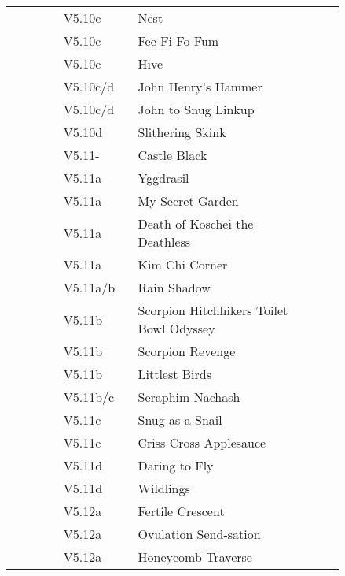 \begin{flushleft}
\begin{center}
\begin{supertabular}{p{0.13\linewidth}p{0.18\linewidth}p{0.45\linewidth}p{0.08\linewidth}}
&V5.10c&Nest & \pageref{rt:Nest} \\
&V5.10c&Fee-Fi-Fo-Fum & \pageref{rt:Fee-Fi-Fo-Fum} \\
&V5.10c&Hive & \pageref{rt:Hive} \\
&V5.10c/d&John Henry's Hammer & \pageref{rt:John Henry's Hammer} \\
&V5.10c/d&John to Snug Linkup & \pageref{vr:John to Snug Linkup} \\
&V5.10d&Slithering Skink & \pageref{rt:Slithering Skink} \\
&V5.11-&Castle Black & \pageref{rt:Castle Black} \\
&V5.11a&Yggdrasil & \pageref{rt:Yggdrasil} \\
&V5.11a&My Secret Garden & \pageref{rt:My Secret Garden} \\
&V5.11a&Death of Koschei the Deathless & \pageref{rt:Death of Koschei the Deathless} \\
&V5.11a&Kim Chi Corner & \pageref{rt:Kim Chi Corner} \\
&V5.11a/b&Rain Shadow & \pageref{rt:Rain Shadow} \\
&V5.11b&Scorpion Hitchhikers Toilet Bowl Odyssey & \pageref{rt:Scorpion Hitchhikers Toilet Bowl Odyssey} \\
&V5.11b&Scorpion Revenge & \pageref{rt:Scorpion Revenge} \\
&V5.11b&Littlest Birds & \pageref{rt:Littlest Birds} \\
&V5.11b/c&Seraphim Nachash & \pageref{rt:Seraphim Nachash} \\
&V5.11c&Snug as a Snail & \pageref{rt:Snug as a Snail} \\
&V5.11c&Criss Cross Applesauce & \pageref{rt:Criss Cross Applesauce} \\
&V5.11d&Daring to Fly & \pageref{rt:Daring to Fly} \\
&V5.11d&Wildlings & \pageref{rt:Wildlings} \\
&V5.12a&Fertile Crescent & \pageref{rt:Fertile Crescent} \\
&V5.12a&Ovulation Send-sation & \pageref{rt:Ovulation Send-sation} \\
&V5.12a&Honeycomb Traverse & \pageref{vr:Honeycomb Traverse} \\

\end{supertabular}
\end{center}
\end{flushleft}
